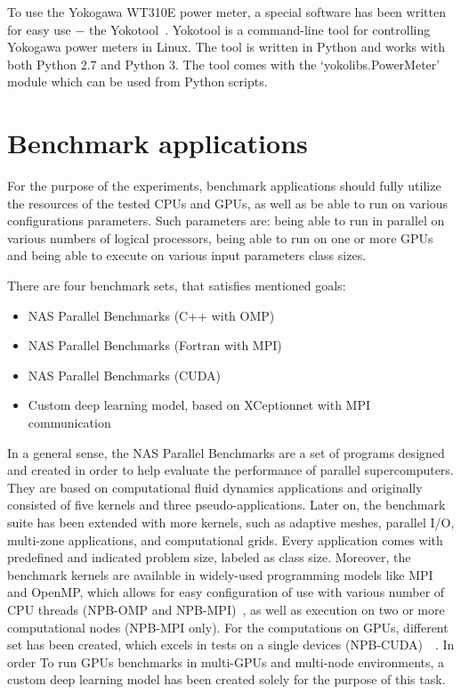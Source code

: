 To use the Yokogawa WT310E power meter, a special software has
been written for easy use $-$ the Yokotool~\cite{GitHub_intel/yoko-tool}.
Yokotool is a command-line tool for controlling Yokogawa power
meters in Linux. The tool is written in Python and works with both
Python 2.7 and Python 3. The tool comes with the
`yokolibs.PowerMeter' module which can be used from Python scripts.

\newpage

\section{Benchmark applications}

For the purpose of the experiments, benchmark applications should
fully utilize the resources of the tested CPUs and GPUs, as well as
be able to run on various configurations parameters. Such parameters
are: being able to run in parallel on various numbers of logical
processors, being able to run on one or more GPUs and being able to
execute on various input parameters class sizes.

There are four benchmark sets, that satisfies mentioned goals:
\begin{itemize}
    \item NAS Parallel Benchmarks (C++ with OMP)
    \item NAS Parallel Benchmarks (Fortran with MPI)
    \item NAS Parallel Benchmarks (CUDA)
    \item Custom deep learning model, based on XCeptionnet with MPI communication
\end{itemize}

In a general sense, the NAS Parallel Benchmarks are a set of programs designed
and created in order to help evaluate the performance of parallel
supercomputers. They are based on computational fluid dynamics applications and
originally consisted of five kernels and three pseudo-applications. Later on,
the benchmark suite has been extended with more kernels, such as adaptive meshes,
parallel I/O, multi-zone applications, and computational grids. Every application
comes with predefined and indicated problem size, labeled as class size.
Moreover, the benchmark kernels are available in widely-used programming
models like MPI and OpenMP, which allows for easy configuration of use with
various number of CPU threads (NPB-OMP and NPB-MPI)~\cite{NPB-CPP}, as well
as execution on two or more computational nodes (NPB-MPI only). For the
computations on GPUs, different set has been created, which excels in tests
on a single devices (NPB-CUDA)~\cite{NPB-CUDA_1}~\cite{NPB-CUDA_2}. In order To
run GPUs benchmarks in multi-GPUs and multi-node environments, a custom deep
learning model has been created solely for the purpose of this task.

